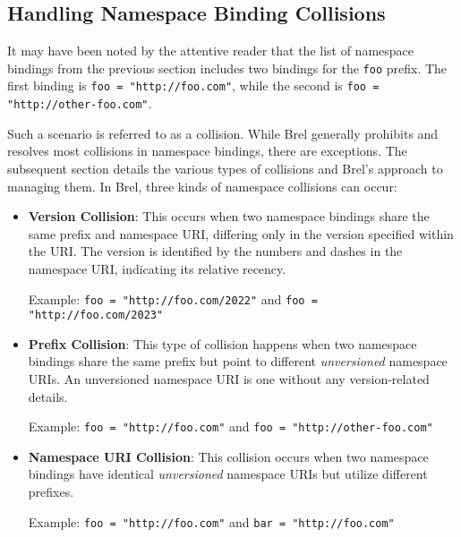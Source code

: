 

\subsection{Handling Namespace Binding Collisions}

It may have been noted by the attentive reader that the list of namespace bindings from the previous section includes two bindings for the \texttt{foo} prefix.
The first binding is \texttt{foo = "http://foo.com"}, while the second is \texttt{foo = "http://other-foo.com"}.

Such a scenario is referred to as a collision.
While Brel generally prohibits and resolves most collisions in namespace bindings, there are exceptions.
The subsequent section details the various types of collisions and Brel's approach to managing them.
In Brel, three kinds of namespace collisions can occur:

\begin{itemize}
\item \textbf{Version Collision}: This occurs when two namespace bindings share the same prefix and namespace URI, differing only in the version specified within the URI.
The version is identified by the numbers and dashes in the namespace URI, indicating its relative recency.

Example: \texttt{foo = "http://foo.com/2022"} and \texttt{foo = "http://foo.com/2023"}
\item \textbf{Prefix Collision}: This type of collision happens when two namespace bindings share the same prefix but point to different \textit{unversioned} namespace URIs.
An unversioned namespace URI is one without any version-related details.

Example: \texttt{foo = "http://foo.com"} and \texttt{foo = "http://other-foo.com"}
\item \textbf{Namespace URI Collision}: This collision occurs when two namespace bindings have identical \textit{unversioned} namespace URIs but utilize different prefixes.

Example: \texttt{foo = "http://foo.com"} and \texttt{bar = "http://foo.com"}
\end{itemize}

